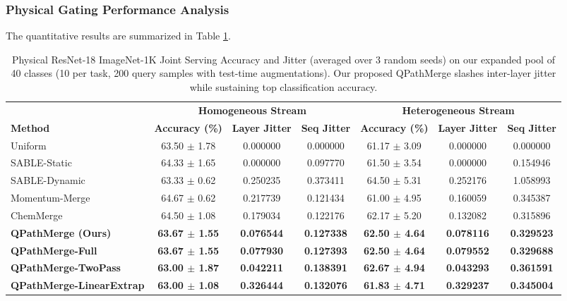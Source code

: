 \subsubsection{Physical Gating Performance Analysis}
The quantitative results are summarized in Table \ref{tab:resnet_results_main}.
\begin{table}[t]
\centering
\caption{Physical ResNet-18 ImageNet-1K Joint Serving Accuracy and Jitter (averaged over 3 random seeds) on our expanded pool of 40 classes (10 per task, 200 query samples with test-time augmentations). Our proposed QPathMerge slashes inter-layer jitter while sustaining top classification accuracy.}
\label{tab:resnet_results_main}
\vskip 0.15in
\begin{small}
\begin{sc}
\begin{tabular}{lcccccc}
\toprule
 & \multicolumn{3}{c}{\textbf{Homogeneous Stream}} & \multicolumn{3}{c}{\textbf{Heterogeneous Stream}} \\
\cmidrule(r){2-4} \cmidrule(l){5-7}
\textbf{Method} & \textbf{Accuracy (\%)} & \textbf{Layer Jitter} & \textbf{Seq Jitter} & \textbf{Accuracy (\%)} & \textbf{Layer Jitter} & \textbf{Seq Jitter} \\
\midrule
Uniform & 63.50 $\pm$ 1.78 & 0.000000 & 0.000000 & 61.17 $\pm$ 3.09 & 0.000000 & 0.000000 \\
SABLE-Static & 64.33 $\pm$ 1.65 & 0.000000 & 0.097770 & 61.50 $\pm$ 3.54 & 0.000000 & 0.154946 \\
SABLE-Dynamic & 63.33 $\pm$ 0.62 & 0.250235 & 0.373411 & 64.50 $\pm$ 5.31 & 0.252176 & 1.058993 \\
Momentum-Merge & 64.67 $\pm$ 0.62 & 0.217739 & 0.121434 & 61.00 $\pm$ 4.95 & 0.160059 & 0.345387 \\
ChemMerge & 64.50 $\pm$ 1.08 & 0.179034 & 0.122176 & 62.17 $\pm$ 5.20 & 0.132082 & 0.315896 \\
\textbf{QPathMerge (Ours)} & \textbf{63.67 $\pm$ 1.55} & \textbf{0.076544} & \textbf{0.127338} & \textbf{62.50 $\pm$ 4.64} & \textbf{0.078116} & \textbf{0.329523} \\
\textbf{QPathMerge-Full} & \textbf{63.67 $\pm$ 1.55} & \textbf{0.077930} & \textbf{0.127393} & \textbf{62.50 $\pm$ 4.64} & \textbf{0.079552} & \textbf{0.329688} \\
\textbf{QPathMerge-TwoPass} & \textbf{63.00 $\pm$ 1.87} & \textbf{0.042211} & \textbf{0.138391} & \textbf{62.67 $\pm$ 4.94} & \textbf{0.043293} & \textbf{0.361591} \\
\textbf{QPathMerge-LinearExtrap} & \textbf{63.00 $\pm$ 1.08} & \textbf{0.326444} & \textbf{0.132076} & \textbf{61.83 $\pm$ 4.71} & \textbf{0.329237} & \textbf{0.345004} \\

\end{tabular}
\end{sc}
\end{small}
\end{table}
